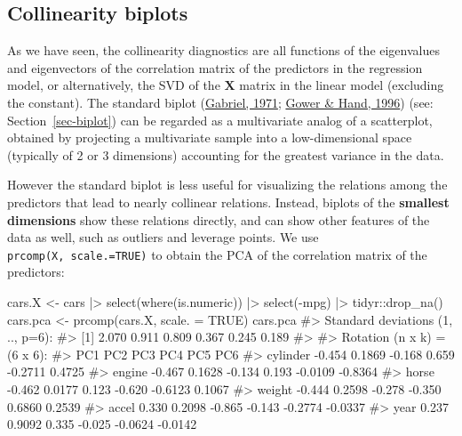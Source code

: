 \documentclass[
  letterpaper,
  10pt,
  krantz2]{krantz}
\makeatletter
\newenvironment{Shaded}{\begin{snugshade}}{\end{snugshade}}
\newcommand{\AttributeTok}[1]{\textcolor[rgb]{0.40,0.45,0.13}{#1}}
\newcommand{\CommentTok}[1]{\textcolor[rgb]{0.37,0.37,0.37}{#1}}
\newcommand{\ConstantTok}[1]{\textcolor[rgb]{0.56,0.35,0.01}{#1}}
\newcommand{\FunctionTok}[1]{\textcolor[rgb]{0.28,0.35,0.67}{#1}}
\newcommand{\NormalTok}[1]{\textcolor[rgb]{0.00,0.23,0.31}{#1}}
\newcommand{\OtherTok}[1]{\textcolor[rgb]{0.00,0.23,0.31}{#1}}
\newcommand{\SpecialCharTok}[1]{\textcolor[rgb]{0.37,0.37,0.37}{#1}}
\newenvironment{kframe}{%
  \medskip{}
  \setlength{\fboxsep}{.8em}
  \def\at@end@of@kframe{}%
  \ifinner\ifhmode%
  \def\at@end@of@kframe{\end{minipage}}%
  \begin{minipage}{\columnwidth}%
  \fi\fi%
  \def\FrameCommand##1{\hskip\@totalleftmargin \hskip-\fboxsep
  \colorbox{shadecolor}{##1}\hskip-\fboxsep
      \hskip-\linewidth \hskip-\@totalleftmargin \hskip\columnwidth}%
  \MakeFramed {\advance\hsize-\width
    \@totalleftmargin\z@ \linewidth\hsize
    \@setminipage}}%
{\par\unskip\endMakeFramed%
  \at@end@of@kframe}
\renewenvironment{Shaded}{\begin{kframe}}{\end{kframe}}
\makeatother
\begin{document}
\hypertarget{collinearity-biplots}{%
\subsection{Collinearity biplots}\label{collinearity-biplots}}

As we have seen, the collinearity diagnostics are all functions of the
eigenvalues and eigenvectors of the correlation matrix of the predictors
in the regression model, or alternatively, the SVD of the \(\mathbf{X}\)
matrix in the linear model (excluding the constant). The standard biplot
(\protect\hyperlink{ref-Gabriel:71}{Gabriel, 1971};
\protect\hyperlink{ref-GowerHand:96}{Gower \& Hand, 1996}) (see:
Section~\ref{sec-biplot}) can be regarded as a multivariate analog of a
scatterplot, obtained by projecting a multivariate sample into a
low-dimensional space (typically of 2 or 3 dimensions) accounting for
the greatest variance in the data.

However the standard biplot is less useful for visualizing the relations
among the predictors that lead to nearly collinear relations. Instead,
biplots of the \textbf{smallest dimensions} show these relations
directly, and can show other features of the data as well, such as
outliers and leverage points. We use \texttt{prcomp(X,\ scale.=TRUE)} to
obtain the PCA of the correlation matrix of the predictors:

\begin{Shaded}
\begin{Highlighting}[]
\NormalTok{cars.X }\OtherTok{\textless{}{-}}\NormalTok{ cars }\SpecialCharTok{|\textgreater{}}
  \FunctionTok{select}\NormalTok{(}\FunctionTok{where}\NormalTok{(is.numeric)) }\SpecialCharTok{|\textgreater{}}
  \FunctionTok{select}\NormalTok{(}\SpecialCharTok{{-}}\NormalTok{mpg) }\SpecialCharTok{|\textgreater{}}
\NormalTok{  tidyr}\SpecialCharTok{::}\FunctionTok{drop\_na}\NormalTok{()}
\NormalTok{cars.pca }\OtherTok{\textless{}{-}} \FunctionTok{prcomp}\NormalTok{(cars.X, }\AttributeTok{scale. =} \ConstantTok{TRUE}\NormalTok{)}
\NormalTok{cars.pca}
\CommentTok{\#\textgreater{} Standard deviations (1, .., p=6):}
\CommentTok{\#\textgreater{} [1] 2.070 0.911 0.809 0.367 0.245 0.189}
\CommentTok{\#\textgreater{} }
\CommentTok{\#\textgreater{} Rotation (n x k) = (6 x 6):}
\CommentTok{\#\textgreater{}             PC1    PC2    PC3    PC4     PC5     PC6}
\CommentTok{\#\textgreater{} cylinder {-}0.454 0.1869 {-}0.168  0.659 {-}0.2711  0.4725}
\CommentTok{\#\textgreater{} engine   {-}0.467 0.1628 {-}0.134  0.193 {-}0.0109 {-}0.8364}
\CommentTok{\#\textgreater{} horse    {-}0.462 0.0177  0.123 {-}0.620 {-}0.6123  0.1067}
\CommentTok{\#\textgreater{} weight   {-}0.444 0.2598 {-}0.278 {-}0.350  0.6860  0.2539}
\CommentTok{\#\textgreater{} accel     0.330 0.2098 {-}0.865 {-}0.143 {-}0.2774 {-}0.0337}
\CommentTok{\#\textgreater{} year      0.237 0.9092  0.335 {-}0.025 {-}0.0624 {-}0.0142}
\end{Highlighting}
\end{Shaded}
\end{document}

